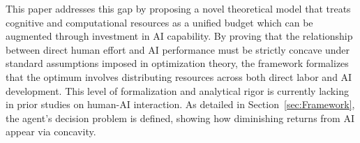 This paper addresses this gap by proposing a novel theoretical model that treats cognitive and computational resources as a unified budget which can be augmented through investment in AI capability. By proving that the relationship between direct human effort and AI performance must be strictly concave under standard assumptions imposed in optimization theory, the framework formalizes that the optimum involves distributing resources across both direct labor and AI development. This level of formalization and analytical rigor is currently lacking in prior studies on human-AI interaction. As detailed in Section~\ref{sec:Framework}, the agent’s decision problem is defined, showing how diminishing returns from AI appear via concavity.
